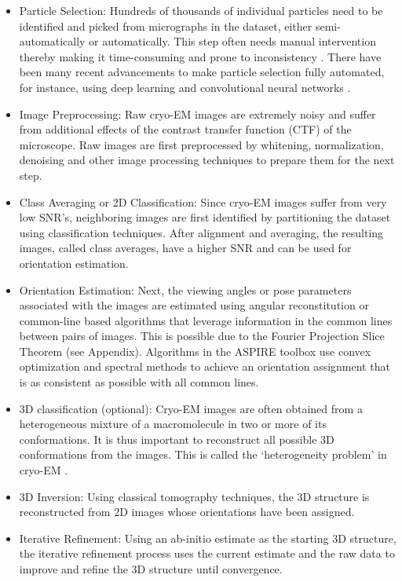 \begin{itemize}
\item Particle Selection: Hundreds of thousands of individual particles need to be identified and picked from micrographs in the dataset, either semi-automatically or automatically. This step often needs manual intervention thereby making it time-consuming and prone to inconsistency \cite{Scheres2015SemiautomatedSO, Norousi2013AutomaticPU}. There have been many recent advancements to make particle selection fully automated, for instance, using deep learning and convolutional neural networks \cite{Wang2016DeepPickerAD}.

\item Image Preprocessing: Raw cryo-EM images are extremely noisy and suffer from additional effects of the contrast transfer function (CTF) of the microscope. Raw images are first preprocessed by whitening, normalization, denoising and other image processing techniques to prepare them for the next step.

\item Class Averaging or 2D Classification: Since cryo-EM images suffer from very low SNR's, neighboring images are first identified by partitioning the dataset using classification techniques. After alignment and averaging, the resulting images, called class averages, have a higher SNR and can be used for orientation estimation.

\item Orientation Estimation: Next, the viewing angles 
or pose parameters associated with the images are estimated using angular reconstitution or common-line based algorithms that leverage information in the common lines between pairs of images. This is possible due to the Fourier Projection Slice Theorem (see Appendix). Algorithms in the ASPIRE toolbox use convex optimization and spectral methods to achieve an orientation assignment that is as consistent as possible with all common lines.

\item 3D classification (optional): Cryo-EM images are often obtained from a heterogeneous mixture of a macromolecule in two or more of its conformations. It is thus important to reconstruct all possible 3D conformations from the images. This is called the `heterogeneity problem' in cryo-EM \cite{Katsevich2015CovarianceME, Tagare2015DirectlyRP}. 

\item 3D Inversion: Using classical tomography techniques, the 3D structure is reconstructed from 2D images whose orientations have been assigned.

\item Iterative Refinement: Using an ab-initio estimate as the starting 3D structure, the iterative refinement process uses the current estimate and the raw data to improve and refine the 3D structure until convergence.

\end{itemize} 
